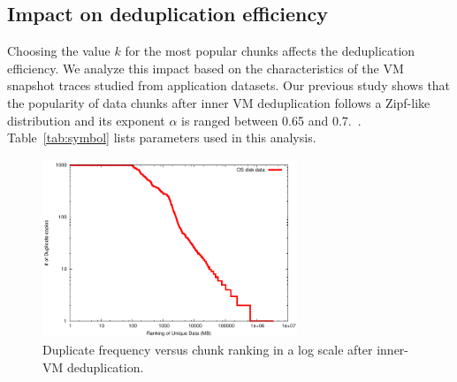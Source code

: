 \subsection{Impact on deduplication efficiency}
Choosing the value  $k$ for the most popular chunks affects the deduplication efficiency.
We analyze this impact based on the characteristics  of the VM snapshot traces
studied from  application datasets.
Our previous study shows that the popularity of data chunks after inner VM deduplication follows 
a Zipf-like distribution\cite{zipf} and its
exponent $\alpha$ is ranged between 0.65  and  0.7.~\cite{ieeecloud}. 
Table~\ref{tab:symbol} lists parameters used in this analysis.

\begin{figure}
\centering
 \includegraphics[width=3in]{figures/log-log-disk}
\caption{Duplicate frequency versus  chunk ranking in a log scale after inner-VM deduplication.}
\label{fig:Datazipf}
\end{figure}

